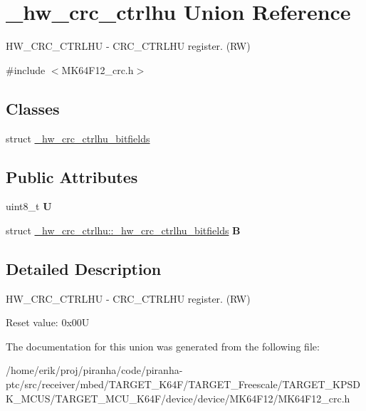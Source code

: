 \hypertarget{union__hw__crc__ctrlhu}{}\section{\+\_\+hw\+\_\+crc\+\_\+ctrlhu Union Reference}
\label{union__hw__crc__ctrlhu}


H\+W\+\_\+\+C\+R\+C\+\_\+\+C\+T\+R\+L\+HU -\/ C\+R\+C\+\_\+\+C\+T\+R\+L\+HU register. (RW)  




{\ttfamily \#include $<$M\+K64\+F12\+\_\+crc.\+h$>$}

\subsection*{Classes}
\begin{DoxyCompactItemize}
\item 
struct \hyperlink{struct__hw__crc__ctrlhu_1_1__hw__crc__ctrlhu__bitfields}{\+\_\+hw\+\_\+crc\+\_\+ctrlhu\+\_\+bitfields}
\end{DoxyCompactItemize}
\subsection*{Public Attributes}
\begin{DoxyCompactItemize}
\item 
uint8\+\_\+t {\bfseries U}\hypertarget{union__hw__crc__ctrlhu_ad1b21c63feb274a009b715824b7a666f}{}\label{union__hw__crc__ctrlhu_ad1b21c63feb274a009b715824b7a666f}

\item 
struct \hyperlink{struct__hw__crc__ctrlhu_1_1__hw__crc__ctrlhu__bitfields}{\+\_\+hw\+\_\+crc\+\_\+ctrlhu\+::\+\_\+hw\+\_\+crc\+\_\+ctrlhu\+\_\+bitfields} {\bfseries B}\hypertarget{union__hw__crc__ctrlhu_a0bf5bd5ac30552bd0f44e09e8e5f24f2}{}\label{union__hw__crc__ctrlhu_a0bf5bd5ac30552bd0f44e09e8e5f24f2}

\end{DoxyCompactItemize}


\subsection{Detailed Description}
H\+W\+\_\+\+C\+R\+C\+\_\+\+C\+T\+R\+L\+HU -\/ C\+R\+C\+\_\+\+C\+T\+R\+L\+HU register. (RW) 

Reset value\+: 0x00U 

The documentation for this union was generated from the following file\+:\begin{DoxyCompactItemize}
\item 
/home/erik/proj/piranha/code/piranha-\/ptc/src/receiver/mbed/\+T\+A\+R\+G\+E\+T\+\_\+\+K64\+F/\+T\+A\+R\+G\+E\+T\+\_\+\+Freescale/\+T\+A\+R\+G\+E\+T\+\_\+\+K\+P\+S\+D\+K\+\_\+\+M\+C\+U\+S/\+T\+A\+R\+G\+E\+T\+\_\+\+M\+C\+U\+\_\+\+K64\+F/device/device/\+M\+K64\+F12/M\+K64\+F12\+\_\+crc.\+h\end{DoxyCompactItemize}
